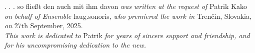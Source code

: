 \documentclass[12pt]{article}
\begin{document}
\vspace*{15\baselineskip}

\begingroup
\begin{center}
. . . so fließt den auch mit ihm davon \textit{was written at the request of} Patrik Kako \textit{on behalf of Ensemble} laug.sonoris, \textit{who premiered the work in} Trenčin, Slovakia, \textit{on} 27th September, 2025. \\
\textit{This work is dedicated to } Patrik \textit{for years of sincere support and friendship, and for his uncompromising dedication to the new.} 
\end{center}
\endgroup
\end{document}
